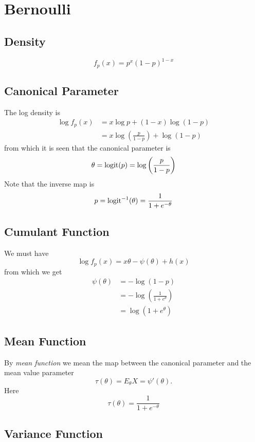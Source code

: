 
\section{Bernoulli}

\subsection{Density}

$$
   f_p(x) = p^x (1 - p)^{1 - x}
$$

\subsection{Canonical Parameter}

The log density is
\begin{align*}
   \log f_p(x)
   & = 
   x \log p + (1 - x) \log (1 - p)
   \\
   & = 
   x \log \left(\frac{p}{1 - p}\right) + \log (1 - p)
\end{align*}
from which it is seen that the canonical parameter is
$$
   \theta = \operatorname{logit}(p) = \log \left(\frac{p}{1 - p}\right)
$$
Note that the inverse map is
$$
   p = \operatorname{logit}^{-1}(\theta) = \frac{1}{1 + e^{- \theta}}
$$

\subsection{Cumulant Function}

We must have
$$
   \log f_p(x) = x \theta - \psi(\theta) + h(x)
$$
from which we get
\begin{align*}
   \psi(\theta)
   & =
   - \log(1 - p)
   \\
   & =
   - \log \left( \frac{1}{1 + e^\theta} \right)
   \\
   & =
   \log \left( 1 + e^\theta \right)
\end{align*}

\subsection{Mean Function}

By \emph{mean function} we mean the map between the canonical parameter
and the mean value parameter
$$
   \tau(\theta) = E_\theta X = \psi'(\theta).
$$
Here
$$
   \tau(\theta) = \frac{1}{1 + e^{- \theta}}
$$

\subsection{Variance Function}


